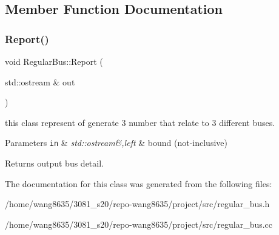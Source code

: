 \subsection{Member Function Documentation}
\mbox{\label{classRegularBus_a6ff6c67f22040ab2c9ad23649c3ba9dc}} 
\subsubsection{\texorpdfstring{Report()}{Report()}}
{\footnotesize\ttfamily void Regular\+Bus\+::\+Report (\begin{DoxyParamCaption}\item[{std\+::ostream \&}]{out }\end{DoxyParamCaption})}



this class represent of generate 3 number that relate to 3 different buses. 


\begin{DoxyParams}[1]{Parameters}
\mbox{\tt in}  & {\em std\+::ostream\&,left} & bound (not-\/inclusive)\\
\hline
\end{DoxyParams}
\begin{DoxyReturn}{Returns}
output bus detail. 
\end{DoxyReturn}


The documentation for this class was generated from the following files\+:\begin{DoxyCompactItemize}
\item 
/home/wang8635/3081\+\_\+s20/repo-\/wang8635/project/src/regular\+\_\+bus.\+h\item 
/home/wang8635/3081\+\_\+s20/repo-\/wang8635/project/src/regular\+\_\+bus.\+cc\end{DoxyCompactItemize}
